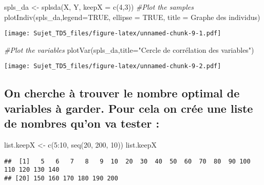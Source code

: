 \documentclass[
]{article}
\newenvironment{Shaded}{\begin{snugshade}}{\end{snugshade}}
\newcommand{\AttributeTok}[1]{\textcolor[rgb]{0.77,0.63,0.00}{#1}}
\newcommand{\CommentTok}[1]{\textcolor[rgb]{0.56,0.35,0.01}{\textit{#1}}}
\newcommand{\ConstantTok}[1]{\textcolor[rgb]{0.00,0.00,0.00}{#1}}
\newcommand{\DecValTok}[1]{\textcolor[rgb]{0.00,0.00,0.81}{#1}}
\newcommand{\FunctionTok}[1]{\textcolor[rgb]{0.00,0.00,0.00}{#1}}
\newcommand{\NormalTok}[1]{#1}
\newcommand{\OtherTok}[1]{\textcolor[rgb]{0.56,0.35,0.01}{#1}}
\newcommand{\SpecialCharTok}[1]{\textcolor[rgb]{0.00,0.00,0.00}{#1}}
\newcommand{\StringTok}[1]{\textcolor[rgb]{0.31,0.60,0.02}{#1}}
\begin{document}
\begin{Shaded}
\begin{Highlighting}[]
\NormalTok{spls\_da }\OtherTok{\textless{}{-}} \FunctionTok{splsda}\NormalTok{(X, Y, }\AttributeTok{keepX =} \FunctionTok{c}\NormalTok{(}\DecValTok{4}\NormalTok{,}\DecValTok{3}\NormalTok{))}
\CommentTok{\#Plot the samples}
\FunctionTok{plotIndiv}\NormalTok{(spls\_da,}\AttributeTok{legend=}\ConstantTok{TRUE}\NormalTok{, }\AttributeTok{ellipse =} \ConstantTok{TRUE}\NormalTok{, }\AttributeTok{title =} \StringTok{\textquotesingle{}Graphe des individus\textquotesingle{}}\NormalTok{)}
\end{Highlighting}
\end{Shaded}

\texttt{[image: Sujet\_TD5\_files/figure-latex/unnamed-chunk-9-1.pdf]}

\begin{Shaded}
\begin{Highlighting}[]
\CommentTok{\#Plot the variables}
\FunctionTok{plotVar}\NormalTok{(spls\_da,}\AttributeTok{title=}\StringTok{"Cercle de corrélation des variables"}\NormalTok{)}
\end{Highlighting}
\end{Shaded}

\texttt{[image: Sujet\_TD5\_files/figure-latex/unnamed-chunk-9-2.pdf]}

\hypertarget{on-cherche-uxe0-trouver-le-nombre-optimal-de-variables-uxe0-garder.-pour-cela-on-cruxe9e-une-liste-de-nombres-quon-va-tester}{%
\subsection{On cherche à trouver le nombre optimal de variables à
garder. Pour cela on crée une liste de nombres qu'on va tester
:}\label{on-cherche-uxe0-trouver-le-nombre-optimal-de-variables-uxe0-garder.-pour-cela-on-cruxe9e-une-liste-de-nombres-quon-va-tester}}

\begin{Shaded}
\begin{Highlighting}[]
\NormalTok{list.keepX }\OtherTok{\textless{}{-}} \FunctionTok{c}\NormalTok{(}\DecValTok{5}\SpecialCharTok{:}\DecValTok{10}\NormalTok{, }\FunctionTok{seq}\NormalTok{(}\DecValTok{20}\NormalTok{, }\DecValTok{200}\NormalTok{, }\DecValTok{10}\NormalTok{))}
\NormalTok{list.keepX}
\end{Highlighting}
\end{Shaded}

\begin{verbatim}
##  [1]   5   6   7   8   9  10  20  30  40  50  60  70  80  90 100 110 120 130 140
## [20] 150 160 170 180 190 200
\end{verbatim}
\end{document}
